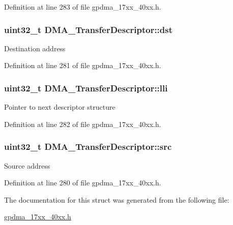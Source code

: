 Definition at line 283 of file gpdma\+\_\+17xx\+\_\+40xx.\+h.

\subsubsection[{\texorpdfstring{dst}{dst}}]{\setlength{\rightskip}{0pt plus 5cm}uint32\+\_\+t D\+M\+A\+\_\+\+Transfer\+Descriptor\+::dst}\hypertarget{structDMA__TransferDescriptor_a661ff33fa31f405b89905f385299e271}{}\label{structDMA__TransferDescriptor_a661ff33fa31f405b89905f385299e271}
Destination address 

Definition at line 281 of file gpdma\+\_\+17xx\+\_\+40xx.\+h.

\subsubsection[{\texorpdfstring{lli}{lli}}]{\setlength{\rightskip}{0pt plus 5cm}uint32\+\_\+t D\+M\+A\+\_\+\+Transfer\+Descriptor\+::lli}\hypertarget{structDMA__TransferDescriptor_ad53035ccb28664c56800a73bb20a7c79}{}\label{structDMA__TransferDescriptor_ad53035ccb28664c56800a73bb20a7c79}
Pointer to next descriptor structure 

Definition at line 282 of file gpdma\+\_\+17xx\+\_\+40xx.\+h.

\subsubsection[{\texorpdfstring{src}{src}}]{\setlength{\rightskip}{0pt plus 5cm}uint32\+\_\+t D\+M\+A\+\_\+\+Transfer\+Descriptor\+::src}\hypertarget{structDMA__TransferDescriptor_a03862efce0e0845dce0cd47e51ed038f}{}\label{structDMA__TransferDescriptor_a03862efce0e0845dce0cd47e51ed038f}
Source address 

Definition at line 280 of file gpdma\+\_\+17xx\+\_\+40xx.\+h.



The documentation for this struct was generated from the following file\+:\begin{DoxyCompactItemize}
\item 
\hyperlink{gpdma__17xx__40xx_8h}{gpdma\+\_\+17xx\+\_\+40xx.\+h}\end{DoxyCompactItemize}
